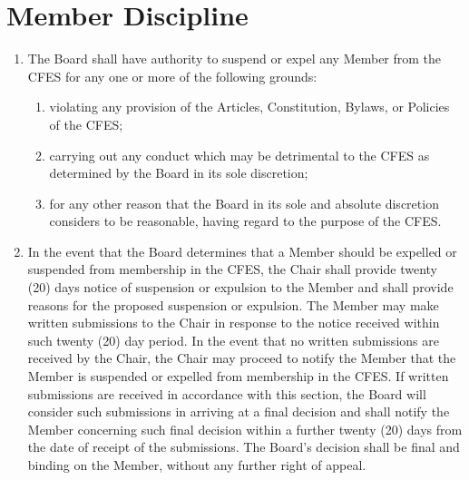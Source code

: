 \section{Member Discipline}
\label{member-discipline}

\begin{enumerate}
 \item The Board shall have authority to suspend or expel any Member from the CFES for any one or more of the following grounds:
  \begin{enumerate}
   \item violating any provision of the Articles, Constitution, Bylaws, or Policies of the CFES;
   \item carrying out any conduct which may be detrimental to the CFES as determined by the Board in its sole discretion;
   \item for any other reason that the Board in its sole and absolute discretion considers to be reasonable, having regard to the purpose of the CFES.
  \end{enumerate}
 \item In the event that the Board determines that a Member should be expelled or suspended from membership in the CFES, the Chair shall provide twenty (20) days notice of suspension or expulsion to the Member and shall provide reasons for the proposed suspension or expulsion. The Member may make written submissions to the Chair in response to the notice received within such twenty (20) day period. In the event that no written submissions are received by the Chair, the Chair may proceed to notify the Member that the Member is suspended or expelled from membership in the CFES. If written submissions are received in accordance with this section, the Board will consider such submissions in arriving at a final decision and shall notify the Member concerning such final decision within a further twenty (20) days from the date of receipt of the submissions. The Board's decision shall be final and binding on the Member, without any further right of appeal.
\end{enumerate}
